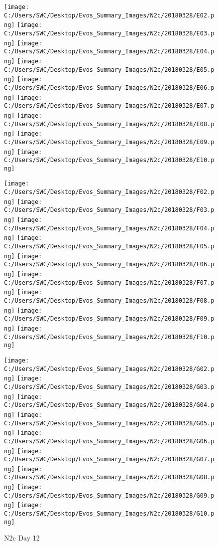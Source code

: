 \documentclass{article}
\begin{document}
\begin{figure}[htp]
\medskip

\texttt{[image: C:/Users/SWC/Desktop/Evos\_Summary\_Images/N2c/20180328/E02.png]}\quad
\texttt{[image: C:/Users/SWC/Desktop/Evos\_Summary\_Images/N2c/20180328/E03.png]}\quad
\texttt{[image: C:/Users/SWC/Desktop/Evos\_Summary\_Images/N2c/20180328/E04.png]}\quad
\texttt{[image: C:/Users/SWC/Desktop/Evos\_Summary\_Images/N2c/20180328/E05.png]}\quad
\texttt{[image: C:/Users/SWC/Desktop/Evos\_Summary\_Images/N2c/20180328/E06.png]}\quad
\texttt{[image: C:/Users/SWC/Desktop/Evos\_Summary\_Images/N2c/20180328/E07.png]}\quad
\texttt{[image: C:/Users/SWC/Desktop/Evos\_Summary\_Images/N2c/20180328/E08.png]}\quad
\texttt{[image: C:/Users/SWC/Desktop/Evos\_Summary\_Images/N2c/20180328/E09.png]}\quad
\texttt{[image: C:/Users/SWC/Desktop/Evos\_Summary\_Images/N2c/20180328/E10.png]}\quad

\medskip

\texttt{[image: C:/Users/SWC/Desktop/Evos\_Summary\_Images/N2c/20180328/F02.png]}\quad
\texttt{[image: C:/Users/SWC/Desktop/Evos\_Summary\_Images/N2c/20180328/F03.png]}\quad
\texttt{[image: C:/Users/SWC/Desktop/Evos\_Summary\_Images/N2c/20180328/F04.png]}\quad
\texttt{[image: C:/Users/SWC/Desktop/Evos\_Summary\_Images/N2c/20180328/F05.png]}\quad
\texttt{[image: C:/Users/SWC/Desktop/Evos\_Summary\_Images/N2c/20180328/F06.png]}\quad
\texttt{[image: C:/Users/SWC/Desktop/Evos\_Summary\_Images/N2c/20180328/F07.png]}\quad
\texttt{[image: C:/Users/SWC/Desktop/Evos\_Summary\_Images/N2c/20180328/F08.png]}\quad
\texttt{[image: C:/Users/SWC/Desktop/Evos\_Summary\_Images/N2c/20180328/F09.png]}\quad
\texttt{[image: C:/Users/SWC/Desktop/Evos\_Summary\_Images/N2c/20180328/F10.png]}\quad

\medskip

\texttt{[image: C:/Users/SWC/Desktop/Evos\_Summary\_Images/N2c/20180328/G02.png]}\quad
\texttt{[image: C:/Users/SWC/Desktop/Evos\_Summary\_Images/N2c/20180328/G03.png]}\quad
\texttt{[image: C:/Users/SWC/Desktop/Evos\_Summary\_Images/N2c/20180328/G04.png]}\quad
\texttt{[image: C:/Users/SWC/Desktop/Evos\_Summary\_Images/N2c/20180328/G05.png]}\quad
\texttt{[image: C:/Users/SWC/Desktop/Evos\_Summary\_Images/N2c/20180328/G06.png]}\quad
\texttt{[image: C:/Users/SWC/Desktop/Evos\_Summary\_Images/N2c/20180328/G07.png]}\quad
\texttt{[image: C:/Users/SWC/Desktop/Evos\_Summary\_Images/N2c/20180328/G08.png]}\quad
\texttt{[image: C:/Users/SWC/Desktop/Evos\_Summary\_Images/N2c/20180328/G09.png]}\quad
\texttt{[image: C:/Users/SWC/Desktop/Evos\_Summary\_Images/N2c/20180328/G10.png]}\quad

\medskip


\caption{N2c Day 12}
\label{pics:blablabla}
\end{figure}
\end{document}
